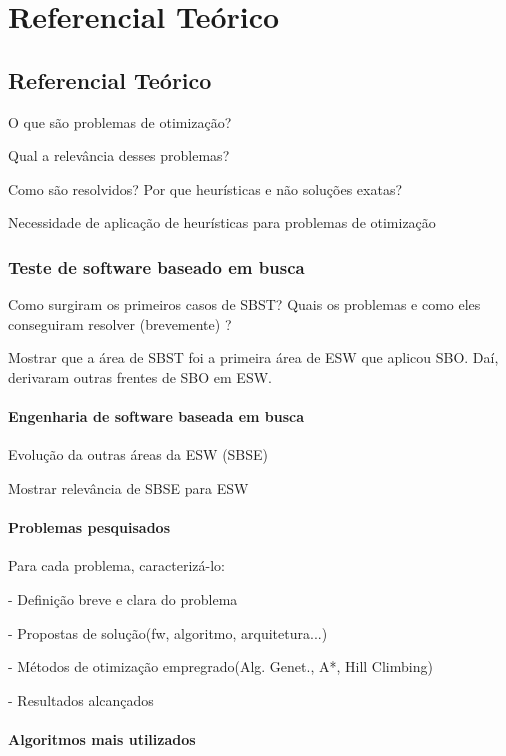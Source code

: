 \part{Referencial Teórico}

\chapter[Referencial Teórico]{Referencial Teórico}

O que são problemas de otimização?

Qual a relevância desses problemas?

Como são resolvidos? Por que heurísticas e não soluções exatas?

Necessidade de aplicação de heurísticas para problemas de otimização

\section{Teste de software baseado em busca}

Como surgiram os primeiros casos de SBST? Quais os problemas e como
eles conseguiram resolver (brevemente) ?

Mostrar que a área de SBST foi a primeira área de ESW que aplicou SBO. Daí, derivaram outras frentes de SBO em ESW.

\subsection{Engenharia de software baseada em busca}

Evolução da outras áreas da ESW (SBSE)

Mostrar relevância de SBSE para ESW

\subsection{Problemas pesquisados}

Para cada problema, caracterizá-lo:

- Definição breve e clara do problema

- Propostas de solução(fw, algoritmo, arquitetura...)

- Métodos de otimização empregrado(Alg. Genet., A*, Hill Climbing)

- Resultados alcançados

\subsection{Algoritmos mais utilizados}







